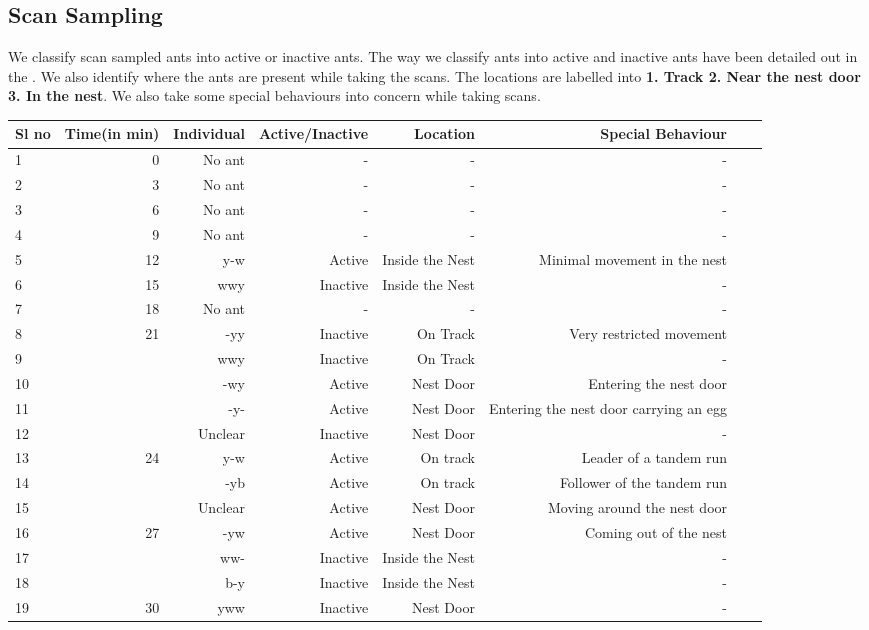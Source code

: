 \documentclass{scrartcl}
\begin{document}
\subsection{Scan Sampling}
We classify scan sampled ants into active or inactive ants. The way we classify ants into active and 
inactive ants have been detailed out in the . We also identify where the ants are present 
while taking the scans. The locations are labelled into \textbf{1. Track 2. Near the nest door 3. In the nest}.
We also take some special behaviours into concern while taking scans.
\begin{adjustwidth}{-2.5 cm}{-2.5 cm}\centering\begin{threeparttable}[!htb]
\scriptsize
\begin{tabular}{lrrrrrrr}\toprule
Sl no &Time(in min) &Individual &Active/Inactive &Location &Special Behaviour & \\\midrule
1 &0 &No ant &- &- &- & \\
2 &3 &No ant &- &- &- & \\
3 &6 &No ant &- &- &- & \\
4 &9 &No ant &- &- &- & \\
5 &12 &y-w &Active &Inside the Nest &Minimal movement in the nest & \\
6 &15 &wwy &Inactive &Inside the Nest &- & \\
7 &18 &No ant &- &- &- & \\
8 &\multirow{5}{*}{21} &-yy &Inactive &On Track &Very restricted movement & \\
9 & &wwy &Inactive &On Track &- & \\
10 & &-wy &Active &Nest Door &Entering the nest door & \\
11 & &-y- &Active &Nest Door &Entering the nest door carrying an egg & \\
12 & &Unclear &Inactive &Nest Door &- & \\
13 &\multirow{3}{*}{24} &y-w &Active &On track &Leader of a tandem run & \\
14 & &-yb &Active &On track &Follower of the tandem run & \\
15 & &Unclear &Active &Nest Door &Moving around the nest door & \\
16 &\multirow{3}{*}{27} &-yw &Active &Nest Door &Coming out of the nest & \\
17 & &ww- &Inactive &Inside the Nest &- & \\
18 & &b-y &Inactive &Inside the Nest &- & \\
19 &\multirow{2}{*}{30} &yww &Inactive &Nest Door &- & \\

\end{tabular}
\end{threeparttable}
\end{adjustwidth}
\end{document}
